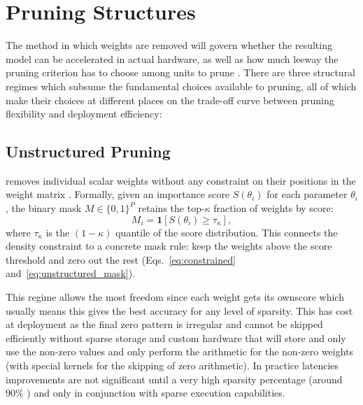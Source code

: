 \section{Pruning Structures}
\label{sec:pruning_structures}

The method in which weights are removed will govern whether the resulting model can be accelerated in actual hardware, as well as how much leeway the pruning criterion has to choose among units to prune \cite{cheng2024survey,hoefler2021sparsity}. There are three structural regimes which subsume the fundamental choices available to pruning, all of which make their choices at different places on the trade-off curve between pruning flexibility and deployment efficiency:

\subsection{Unstructured Pruning}
\label{subsec:unstructured_pruning}

 removes individual scalar weights without any
constraint on their positions in the weight matrix \cite{han2015deep}.
Formally, given an importance score $S(\theta_i)$ for each parameter
$\theta_i$, the binary mask $M \in \{0,1\}^P$ retains the top-$\kappa$
fraction of weights by score:
\begin{equation}
	M_i = \mathbf{1}\!\left[S(\theta_i) \ge \tau_\kappa\right],
	\label{eq:unstructured_mask}
\end{equation}
where $\tau_\kappa$ is the $(1-\kappa)$ quantile of the score distribution.
This connects the density constraint to a concrete mask rule: keep the weights above the score threshold and zero out the rest (Eqs.~\eqref{eq:constrained} and~\eqref{eq:unstructured_mask}).

This regime allows the most freedom since each weight gets its ownscore which usually means this gives the best accuracy for any level of sparsity\cite{frankle2018lottery}. This has cost at deployment as the final zero pattern is irregular and cannot be skipped efficiently without sparse storage and custom hardware that will store and only use the non-zero values and only perform the arithmetic for the non-zero weights (with special kernels for the skipping of zero arithmetic). In practice latencies improvements are not significant until a very high sparsity percentage (around $90\%$ ) and only in conjunction with sparse execution capabilities\cite{gale2020sparsegpu}.

